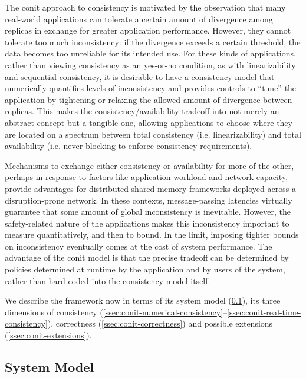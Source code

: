 \documentclass[]             %
{NASA}                       %
\theoremstyle{definition}
\begin{document}
The conit approach to consistency is motivated by the observation that
many real-world applications can tolerate a certain amount of
divergence among replicas in exchange for greater application
performance. However, they cannot tolerate too much inconsistency: if
the divergence exceeds a certain threshold, the data becomes too
unreliable for its intended use. For these kinds of applications,
rather than viewing consistency as an yes-or-no condition, as with
linearizability and sequential consistency, it is desirable to have a
consistency model that numerically quantifies levels of inconsistency
and provides controls to ``tune'' the application by tightening or
relaxing the allowed amount of divergence between replicas. This makes
the consistency/availability tradeoff into not merely an abstract
concept but a tangible one, allowing applications to choose where they
are located on a spectrum between total consistency
(i.e. linearizability) and total availability (i.e. never blocking to
enforce consistency requirements).

Mechanisms to exchange either consistency or availability for more of
the other, perhaps in response to factors like application workload
and network capacity, provide advantages for distributed shared memory
frameworks deployed across a disruption-prone network. In these
contexts, message-passing latencies virtually guarantee that some
amount of global inconsistency is inevitable. However, the
safety-related nature of the applications makes this inconsistency
important to measure quantitatively, and then to bound. In the limit,
imposing tighter bounds on inconsistency eventually comes at the cost
of system performance. The advantage of the conit model is that the
precise tradeoff can be determined by policies determined at runtime
by the application and by users of the system, rather than hard-coded
into the consistency model itself.

We describe the framework now in terms of its system model
(\ref{ssec:conit-system-model}), its three dimensions of consistency
(\ref{ssec:conit-numerical-consistency}--\ref{ssec:conit-real-time-consistency}),
correctness (\ref{ssec:conit-correctness}) and possible extensions
(\ref{ssec:conit-extensions}).



\subsection{System Model}
\label{ssec:conit-system-model}
\end{document}
